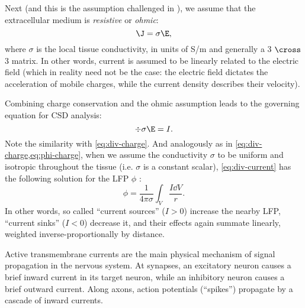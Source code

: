 Next (and this is the assumption challenged in \cite{Bedard2011}), we assume that the extracellular medium is \emph{resistive} or \emph{ohmic}:
%
\begin{equation}
\label{eq:ohmic-medium}
\J = \sigma \E,
\end{equation}
%
where $\sigma$ is the local tissue conductivity, in units of S/m and generally a 3 $\cross$ 3 matrix. In other words, current is assumed to be linearly related to the electric field (which in reality need not be the case: the electric field dictates the acceleration of mobile charges, while the current density describes their velocity).

Combining charge conservation and the ohmic assumption leads to the governing equation for CSD analysis:
%
\begin{equation}
\label{eq:div-current}
\div{\sigma \E} = I.
\end{equation}
%
Note the similarity with \cref{eq:div-charge}. And analogously as in \cref{eq:div-charge,eq:phi-charge}, when we assume the conductivity $\sigma$ to be uniform and isotropic throughout the tissue (i.e. $\sigma$ is a constant scalar)\footnotemark{}, \cref{eq:div-current} has the following solution for the LFP $\phi$ \cite{Plonsey2007}:
%
\begin{equation}
\label{eq:phi-current}
\phi = \frac{1}{4 \pi \sigma} \int_V \frac{I \dd{V}}{r}.
\end{equation}
%
In other words, so called ``current sources'' ($I > 0$) increase the nearby LFP, ``current sinks'' ($I < 0$) decrease it, and their effects again summate linearly, weighted inverse-proportionally by distance.


Active transmembrane currents are the main physical mechanism of signal propagation in the nervous system.\footnotemark{} At synapses, an excitatory neuron causes a brief inward current in its target neuron, while an inhibitory neuron causes a brief outward current. Along axons, action potentials (``spikes'') propagate by a cascade of inward currents.


